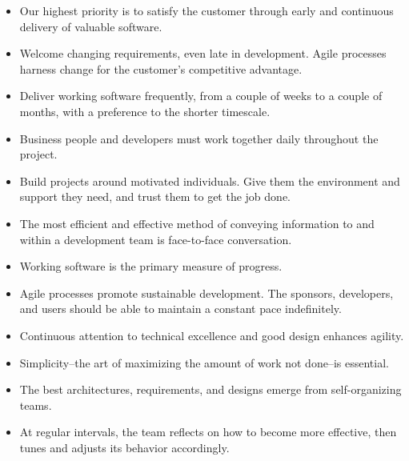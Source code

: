 \documentclass[]{article}
\begin{document}
\begin{itemize}
	\item Our highest priority is to satisfy the customer through early and continuous delivery of valuable software.
	\item Welcome changing requirements, even late in development. Agile processes harness change for the customer's competitive advantage.
	\item Deliver working software frequently, from a couple of weeks to a couple of months, with a preference to the shorter timescale.
	\item Business people and developers must work together daily throughout the project.
	\item Build projects around motivated individuals. Give them the environment and support they need, and trust them to get the job done.
	\item The most efficient and effective method of conveying information to and within a development team is face-to-face conversation.
	\item Working software is the primary measure of progress.
	\item Agile processes promote sustainable development. The sponsors, developers, and users should be able to maintain a constant pace indefinitely.
	\item Continuous attention to technical excellence and good design enhances agility.
	\item Simplicity--the art of maximizing the amount of work not done--is essential.
	\item The best architectures, requirements, and designs emerge from self-organizing teams.
	\item At regular intervals, the team reflects on how to become more effective, then tunes and adjusts its behavior accordingly.
	
\end{itemize}
\end{document}
